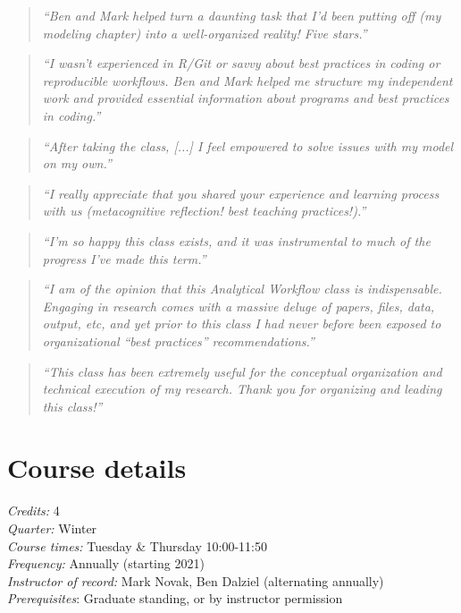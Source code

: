 \documentclass[10pt]{article}
\begin{document}
\begin{quote}
\emph{``Ben and Mark helped turn a daunting task that I'd been putting off (my modeling chapter) into a well-organized reality! Five stars.''}
\end{quote}
\begin{quote}
	\emph{``I wasn't experienced in R/Git or savvy about best practices in coding or reproducible workflows. Ben and Mark helped me structure my independent work and provided essential information about programs and best practices in coding.''}
\end{quote}
\begin{quote}
	\emph{``After taking the class, [...] I feel empowered to solve issues with my model on my own.''}
\end{quote}
\begin{quote}
	\emph{``I really appreciate that you shared your experience and learning process with us (metacognitive reflection! best teaching practices!).''}
\end{quote}
\begin{quote}
	\emph{``I'm so happy this class exists, and it was instrumental to much of the progress I've made this term.''}
\end{quote}
\begin{quote}
	\emph{``I am of the opinion that this Analytical Workflow class is indispensable. Engaging in research comes with a massive deluge of papers, files, data, output, etc, and yet prior to this class I had never before been exposed to organizational ``best practices'' recommendations.''}
\end{quote}
\begin{quote}
	\emph{``This class has been extremely useful for the conceptual organization and technical execution of my research. Thank you for organizing and leading this class!''}
\end{quote}



\section*{Course details}
\emph{Credits:} 4\\
\emph{Quarter:} Winter\\
\emph{Course times:} Tuesday \& Thursday 10:00-11:50\\
\emph{Frequency:} Annually (starting 2021)\\
\emph{Instructor of record:} Mark Novak, Ben Dalziel (alternating annually)\\
\emph{Prerequisites}: Graduate standing, or by instructor permission\\
\end{document}
